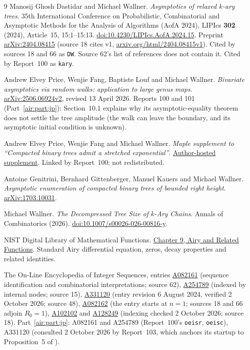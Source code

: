 \documentclass[11pt,letterpaper]{article}
\numberwithin{equation}{section}
\theoremstyle{remark}
\begin{document}
\begin{thebibliography}{9}
Manosij Ghosh Dastidar and Michael Wallner.
\emph{Asymptotics of relaxed $k$-ary trees}.
35th International Conference on Probabilistic, Combinatorial and Asymptotic Methods for the Analysis of Algorithms (AofA 2024), LIPIcs \textbf{302} (2024), Article~15, 15:1--15:13.
\href{https://doi.org/10.4230/LIPIcs.AofA.2024.15}{doi:10.4230/LIPIcs.AofA.2024.15}.
Preprint \href{https://arxiv.org/abs/2404.08415}{arXiv:2404.08415} (source 18 cites v1, \href{https://arxiv.org/html/2404.08415v1}{arxiv.org/html/2404.08415v1}). Cited by sources 18 and 66 as \texttt{DW}. Source 62's list of references does not contain it. Cited by Report~100 as \texttt{kary}.

Andrew Elvey Price, Wenjie Fang, Baptiste Louf and Michael Wallner.
\emph{Bivariate asymptotics via random walks: application to large genus maps}.
\href{https://arxiv.org/abs/2506.06924v2}{arXiv:2506.06924v2}, revised 13 April 2026.
Reports 100 and 101 (Part~\ref{air:part:jp}): Section~10.1 explains why its asymptotic-equality theorem does not settle the tree amplitude (the walk can leave the boundary, and its asymptotic initial condition is unknown).

Andrew Elvey Price, Wenjie Fang and Michael Wallner.
\emph{Maple supplement to ``Compacted binary trees admit a stretched exponential''}.
\href{https://www.dmg.tuwien.ac.at/mwallner/files/2019ElveyPriceFangWallnerCompactedAiry.mw}{Author-hosted supplement}.
Linked by Report~100; not redistributed.

Antoine Genitrini, Bernhard Gittenberger, Manuel Kauers and Michael Wallner.
\emph{Asymptotic enumeration of compacted binary trees of bounded right height}.
\href{https://arxiv.org/abs/1703.10031}{arXiv:1703.10031}.

Michael Wallner.
\emph{The Decompressed Tree Size of $k$-Ary Chains}.
Annals of Combinatorics (2026).
\href{https://doi.org/10.1007/s00026-026-00816-y}{doi:10.1007/s00026-026-00816-y}.

NIST Digital Library of Mathematical Functions.
\href{https://dlmf.nist.gov/9}{Chapter 9, Airy and Related Functions}.
Standard Airy differential equation, zeros, decay properties and related identities.

The On-Line Encyclopedia of Integer Sequences, entries
\href{https://oeis.org/A082161}{A082161} (sequence identification and combinatorial interpretations; source 62),
\href{https://oeis.org/A254789}{A254789} (indexed by internal nodes; source 15),
\href{https://oeis.org/A331120}{A331120} (entry revision 6 August 2024, verified 2 October 2026; source 48),
\href{https://oeis.org/A082162}{A082162} (the entry starts at $n=1$; sources 18 and 66 adjoin $R_0=1$),
\href{https://oeis.org/A102102}{A102102} and
\href{https://oeis.org/A128249}{A128249} (indexing checked 2 October 2026; source 18).
Part~\ref{air:part:jp}: A082161 and A254789 (Report~100's \texttt{oeisr}, \texttt{oeisc}), A331120 (consulted 2 October 2026 by Report~103, which anchors its startup to Proposition~5 of \cite{dfa}).
\end{thebibliography}
\endgroup
\end{document}
